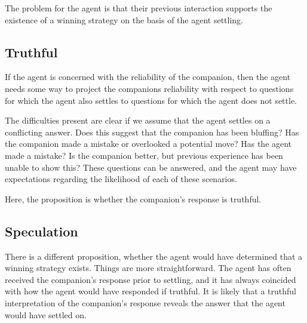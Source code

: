 \documentclass[10pt]{article}
\begin{document}


The problem for the agent is that their previous interaction supports the existence of a winning strategy on the basis of the agent settling.

\subsection{Truthful}
\label{sec:truthful}

If the agent is concerned with the reliability of the companion, then the agent needs some way to project the companions reliability with respect to questions for which the agent also settles to questions for which the agent does not settle.

The difficulties present are clear if we assume that the agent settles on a conflicting answer.
Does this suggest that the companion has been bluffing?
Has the companion made a mistake or overlooked a potential move?
Has the agent made a mistake?
Is the companion better, but previous experience has been unable to show this?
These questions can be answered, and the agent may have expectations regarding the likelihood of each of these scenarios.

Here, the proposition is whether the companion's response is truthful.

\subsection{Speculation}
\label{sec:speculation-1}

There is a different proposition, whether the agent would have determined that a winning strategy exists.
Things are more straightforward.
The agent has often received the companion's response prior to settling, and it has always coincided with how the agent would have responded if truthful.
It is likely that a truthful interpretation of the companion's response reveals the answer that the agent would have settled on.
\end{document}

